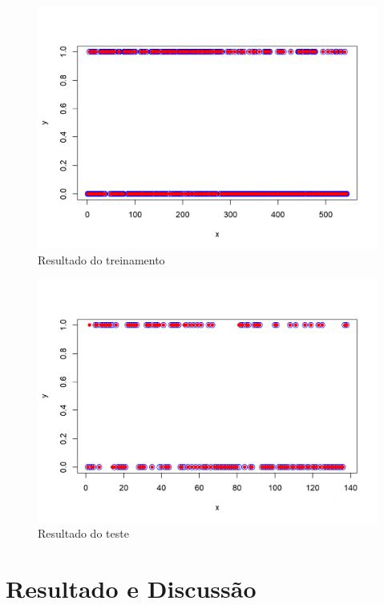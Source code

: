 \documentclass[conference]{IEEEtran}
\begin{document}
	 
    \begin{figure}[htbp]
	\centerline{\includegraphics[scale=0.15]{grafico-treinamento.png}}
	\caption{Resultado do treinamento}
	
	\label{fig}
	\end{figure}
	
    \begin{figure}[htbp]
	\centerline{\includegraphics[scale=0.15]{grafico-teste.png}}
	\caption{Resultado do teste}
	
	\label{fig}
	\end{figure}
	
\section{Resultado e Discussão}
\end{document}
